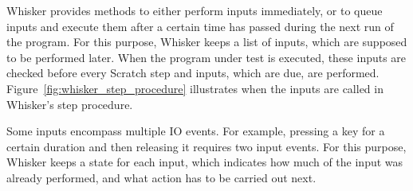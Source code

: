 Whisker provides methods to either perform inputs immediately,
or to queue inputs and execute them after a certain time has passed during the next run of the program.
For this purpose, Whisker keeps a list of inputs, which are supposed to be performed later.
When the program under test is executed, these inputs are checked before every Scratch step
and inputs, which are due, are performed.
Figure~\ref{fig:whisker_step_procedure} illustrates when the inputs are called in Whisker's step procedure.
\parspace

Some inputs encompass multiple IO events.
For example, pressing a key for a certain duration and then releasing it requires two input events.
For this purpose, Whisker keeps a state for each input,
which indicates how much of the input was already performed,
and what action has to be carried out next.

